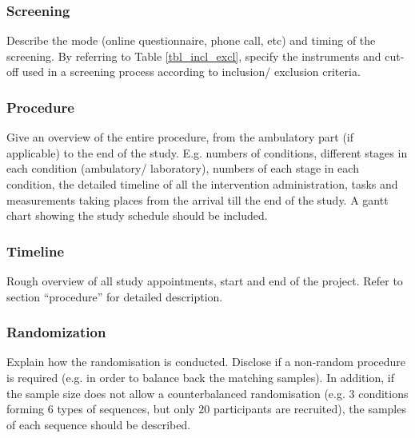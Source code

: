 \subsubsection{Screening}
\begin{prereg}
\begin{instruction}
Describe the mode (online questionnaire, phone call, etc) and timing of the screening. By referring to Table \cref{tbl_incl_excl}, specify the instruments and cut-off used in a screening process according to inclusion/ exclusion criteria.
\end{instruction}
\end{prereg}

\subsubsection{Procedure}

\begin{prereg}
\begin{instruction}
Give an overview of the entire procedure, from the ambulatory part (if applicable) to the end of the study. E.g. numbers of conditions, different stages in each condition (ambulatory/ laboratory), numbers of each stage in each condition, the detailed timeline of all the intervention administration, tasks and measurements taking places from the arrival till the end of the study. A gantt chart showing the study schedule should be included.  
\end{instruction}
\end{prereg}


\subsubsection{Timeline}

\begin{prereg}
\begin{instruction}
Rough overview of all study appointments, start and end of the project. Refer to section “procedure” for detailed description. 
\end{instruction}
\end{prereg}


\subsubsection{Randomization}

\begin{prereg}
\begin{instruction}
Explain how the randomisation is conducted. Disclose if a non-random procedure is required (e.g. in order to balance back the matching samples). In addition, if the sample size does not allow a counterbalanced randomisation (e.g. $3$ conditions forming 6 types of sequences, but only $20$ participants are recruited), the samples of each sequence should be described.
\end{instruction}
\end{prereg}